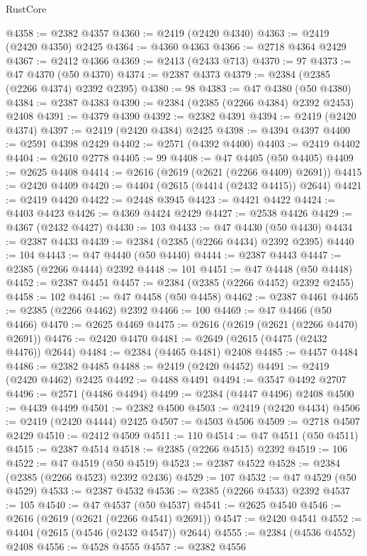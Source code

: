 \begin{lexlean}{RustCore}
\begin{coremodule}
@4358 := @2382 @4357
@4360 := @2419 (@2420 @4340)
@4363 := @2419 (@2420 @4350) @2425
@4364 := @4360 @4363
@4366 := @2718 @4364 @2429
@4367 := @2412 @4366
@4369 := @2413 (@2433 @713)
@4370 := 97
@4373 := @47 @4370 (@50 @4370)
@4374 := @2387 @4373
@4379 := @2384 (@2385 (@2266 @4374) @2392 @2395)
@4380 := 98
@4383 := @47 @4380 (@50 @4380)
@4384 := @2387 @4383
@4390 := @2384 (@2385 (@2266 @4384) @2392 @2453) @2408
@4391 := @4379 @4390
@4392 := @2382 @4391
@4394 := @2419 (@2420 @4374)
@4397 := @2419 (@2420 @4384) @2425
@4398 := @4394 @4397
@4400 := @2591 @4398 @2429
@4402 := @2571 (@4392 @4400)
@4403 := @2419 @4402
@4404 := @2610 @2778
@4405 := 99
@4408 := @47 @4405 (@50 @4405)
@4409 := @2625 @4408
@4414 := @2616 (@2619 (@2621 (@2266 @4409) @2691))
@4415 := @2420 @4409
@4420 := @4404 (@2615 (@4414 (@2432 @4415)) @2644)
@4421 := @2419 @4420
@4422 := @2448 @3945
@4423 := @4421 @4422
@4424 := @4403 @4423
@4426 := @4369 @4424 @2429
@4427 := @2538 @4426
@4429 := @4367 (@2432 @4427)
@4430 := 103
@4433 := @47 @4430 (@50 @4430)
@4434 := @2387 @4433
@4439 := @2384 (@2385 (@2266 @4434) @2392 @2395)
@4440 := 104
@4443 := @47 @4440 (@50 @4440)
@4444 := @2387 @4443
@4447 := @2385 (@2266 @4444) @2392
@4448 := 101
@4451 := @47 @4448 (@50 @4448)
@4452 := @2387 @4451
@4457 := @2384 (@2385 (@2266 @4452) @2392 @2455)
@4458 := 102
@4461 := @47 @4458 (@50 @4458)
@4462 := @2387 @4461
@4465 := @2385 (@2266 @4462) @2392
@4466 := 100
@4469 := @47 @4466 (@50 @4466)
@4470 := @2625 @4469
@4475 := @2616 (@2619 (@2621 (@2266 @4470) @2691))
@4476 := @2420 @4470
@4481 := @2649 (@2615 (@4475 (@2432 @4476)) @2644)
@4484 := @2384 (@4465 @4481) @2408
@4485 := @4457 @4484
@4486 := @2382 @4485
@4488 := @2419 (@2420 @4452)
@4491 := @2419 (@2420 @4462) @2425
@4492 := @4488 @4491
@4494 := @3547 @4492 @2707
@4496 := @2571 (@4486 @4494)
@4499 := @2384 (@4447 @4496) @2408
@4500 := @4439 @4499
@4501 := @2382 @4500
@4503 := @2419 (@2420 @4434)
@4506 := @2419 (@2420 @4444) @2425
@4507 := @4503 @4506
@4509 := @2718 @4507 @2429
@4510 := @2412 @4509
@4511 := 110
@4514 := @47 @4511 (@50 @4511)
@4515 := @2387 @4514
@4518 := @2385 (@2266 @4515) @2392
@4519 := 106
@4522 := @47 @4519 (@50 @4519)
@4523 := @2387 @4522
@4528 := @2384 (@2385 (@2266 @4523) @2392 @2436)
@4529 := 107
@4532 := @47 @4529 (@50 @4529)
@4533 := @2387 @4532
@4536 := @2385 (@2266 @4533) @2392
@4537 := 105
@4540 := @47 @4537 (@50 @4537)
@4541 := @2625 @4540
@4546 := @2616 (@2619 (@2621 (@2266 @4541) @2691))
@4547 := @2420 @4541
@4552 := @4404 (@2615 (@4546 (@2432 @4547)) @2644)
@4555 := @2384 (@4536 @4552) @2408
@4556 := @4528 @4555
@4557 := @2382 @4556

\end{coremodule}
\end{lexlean}

